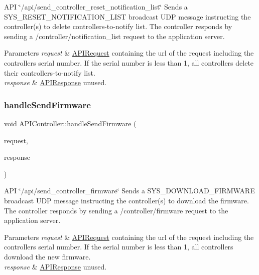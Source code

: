 A\+PI \char`\"{}/api/send\+\_\+controller\+\_\+reset\+\_\+notification\+\_\+list\char`\"{} Sends a S\+Y\+S\+\_\+\+R\+E\+S\+E\+T\+\_\+\+N\+O\+T\+I\+F\+I\+C\+A\+T\+I\+O\+N\+\_\+\+L\+I\+ST broadcast U\+DP message instructing the controller(s) to delete controllers-\/to-\/notify list. The controller responds by sending a /controller/notification\+\_\+list request to the application server. 
\begin{DoxyParams}{Parameters}
{\em request} & \hyperlink{class_a_p_i_request}{A\+P\+I\+Request} containing the url of the request including the controller\textquotesingle{}s serial number. If the serial number is less than 1, all controllers delete their controllers-\/to-\/notify list. \\
\hline
{\em response} & \hyperlink{class_a_p_i_response}{A\+P\+I\+Response} unused. \\
\hline
\end{DoxyParams}
\mbox{\label{class_a_p_i_controller_a2e140228ff2335d0d1a92d2353702c22}} 
\subsubsection{\texorpdfstring{handle\+Send\+Firmware}{handleSendFirmware}}
{\footnotesize\ttfamily void A\+P\+I\+Controller\+::handle\+Send\+Firmware (\begin{DoxyParamCaption}\item[{const \hyperlink{class_a_p_i_request}{A\+P\+I\+Request} \&}]{request,  }\item[{\hyperlink{class_a_p_i_response}{A\+P\+I\+Response} $\ast$}]{response }\end{DoxyParamCaption})\hspace{0.3cm}{\ttfamily [slot]}}

A\+PI \char`\"{}/api/send\+\_\+controller\+\_\+firmware\char`\"{} Sends a S\+Y\+S\+\_\+\+D\+O\+W\+N\+L\+O\+A\+D\+\_\+\+F\+I\+R\+M\+W\+A\+RE broadcast U\+DP message instructing the controller(s) to download the firmware. The controller responds by sending a /controller/firmware request to the application server. 
\begin{DoxyParams}{Parameters}
{\em request} & \hyperlink{class_a_p_i_request}{A\+P\+I\+Request} containing the url of the request including the controller\textquotesingle{}s serial number. If the serial number is less than 1, all controllers download the new firmware. \\
\hline
{\em response} & \hyperlink{class_a_p_i_response}{A\+P\+I\+Response} unused. \\
\hline
\end{DoxyParams}
\mbox{\label{class_a_p_i_controller_ab26bfad170bcd84e1b2763a0798702ad}} 
